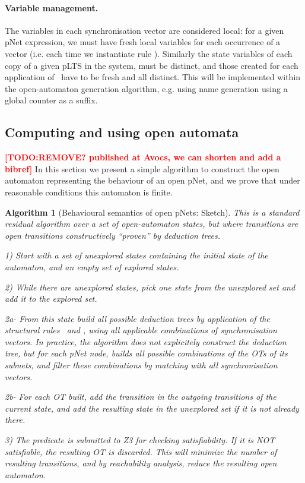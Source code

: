 \documentclass{lncs/llncs}
\newcommand{\TODO}[1]{\textcolor{red}{\textbf{[TODO:#1]}}}
\newtheorem{algorithm}[theorem]{Algorithm}
\begin{document}
\paragraph{Variable management.}
The variables in each synchronisation vector are considered local:
for a given pNet expression, we must have fresh local variables for
each occurrence of a vector (i.e. each time we instantiate rule
\TrDeux). Similarly the state variables of each copy of a
given pLTS in the system, must be distinct, and those created for each
application of \TrDeux\ have to be fresh and all distinct. 
This will be implemented within the open-automaton generation algorithm,
e.g. using name generation using a global counter as a suffix.



\subsection{Computing and using open automata}
\TODO{REMOVE?  published at Avocs, we can shorten and add a bibref}
In this section we present a simple algorithm to construct the open
automaton representing the behaviour of an open pNet, and we prove that
under reasonable conditions this automaton is finite.

\begin{algorithm}[Behavioural semantics of open pNets: Sketch]
This is a standard residual algorithm over a set of open-automaton
states, but where transitions are open transitions
constructively ``proven'' by deduction trees.

1) Start with a set of unexplored states containing the initial state
of the automaton, and an empty set of explored states.

2) While there are unexplored states, pick one state from the
unexplored set and add it to the explored set.

2a- From this state
build all possible deduction trees by application of the structural
rules \TrUn\ and \TrDeux, using all applicable combinations
of synchronisation vectors.
In practice, the algorithm does not explicitely construct the
deduction tree, but for each pNet node, builds all possible
combinations of the OTs of its subnets, and filter these combinations
by matching with all synchronisation vectors. 
 
2b- For each OT built, add the transition in the
outgoing transitions of the current state, and add the
resulting state in the unexplored set if it is not already there.

3) The predicate is submitted to Z3 for checking satisfiability. If it
is NOT satisfiable, the resulting OT is discarded. This will minimize
the number of resulting transitions, and by reachability analysis,
reduce the resulting open automaton.

\end{algorithm}
\end{document}
